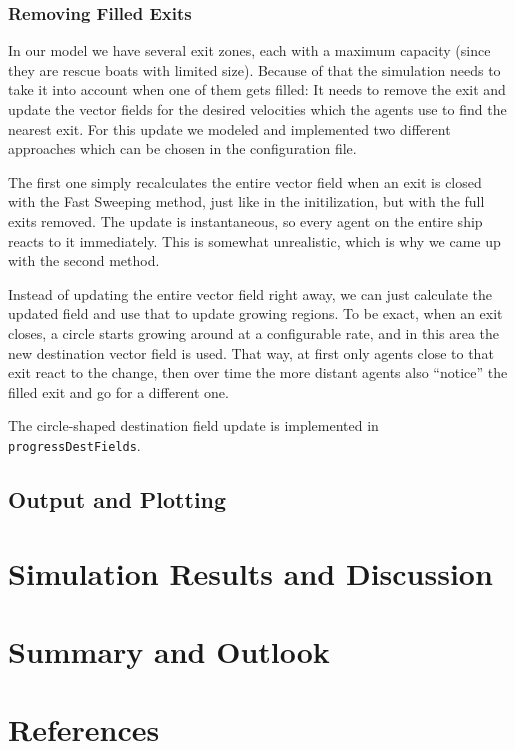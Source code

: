 \documentclass[11pt]{article}
\begin{document}
\subsubsection{Removing Filled Exits}
\label{sub:exitremove}

In our model we have several exit zones, each with a maximum capacity (since
they are rescue boats with limited size).  Because of that the simulation needs
to take it into account when one of them gets filled: It needs to remove the
exit and update the vector fields for the desired velocities which the agents
use to find the nearest exit.  For this update we modeled and implemented two
different approaches which can be chosen in the configuration file.

The first one simply recalculates the entire vector field when an exit is
closed with the Fast Sweeping method, just like in the initilization, but with
the full exits removed.  The update is instantaneous, so every agent on the
entire ship reacts to it immediately.  This is somewhat unrealistic, which is
why we came up with the second method.

Instead of updating the entire vector field right away, we can just calculate
the updated field and use that to update growing regions.  To be exact, when an
exit closes, a circle starts growing around at a configurable rate, and in this
area the new destination vector field is used.  That way, at first only agents
close to that exit react to the change, then over time the more distant agents
also ``notice'' the filled exit and go for a different one.

The circle-shaped destination field update is implemented in
\texttt{progressDestFields}.

\subsection{Output and Plotting}
\label{sub:output}

\section{Simulation Results and Discussion}

\section{Summary and Outlook}

\section{References}

\end{document}
